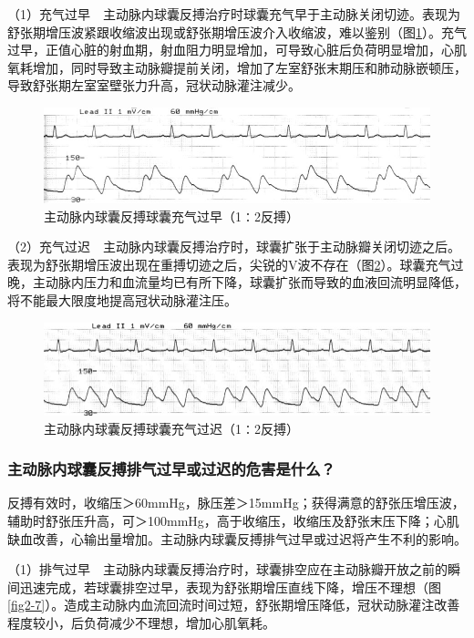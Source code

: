 （1）充气过早　主动脉内球囊反搏治疗时球囊充气早于主动脉关闭切迹。表现为舒张期增压波紧跟收缩波出现或舒张期增压波介入收缩波，难以鉴别（图\ref{fig2-5}）。充气过早，正值心脏的射血期，射血阻力明显增加，可导致心脏后负荷明显增加，心肌氧耗增加，同时导致主动脉瓣提前关闭，增加了左室舒张末期压和肺动脉嵌顿压，导致舒张期左室室壁张力升高，冠状动脉灌注减少。

\begin{figure}[!htbp]
 \centering
 \includegraphics{./images/Image00024.jpg}
 \captionsetup{justification=centering}
 \caption{主动脉内球囊反搏球囊充气过早（1∶2反搏）}
 \label{fig2-5}
  \end{figure} 

（2）充气过迟　主动脉内球囊反搏治疗时，球囊扩张于主动脉瓣关闭切迹之后。表现为舒张期增压波出现在重搏切迹之后，尖锐的V波不存在（图\ref{fig2-6}）。球囊充气过晚，主动脉内压力和血流量均已有所下降，球囊扩张而导致的血液回流明显降低，将不能最大限度地提高冠状动脉灌注压。

\begin{figure}[!htbp]
 \centering
 \includegraphics{./images/Image00025.jpg}
 \captionsetup{justification=centering}
 \caption{主动脉内球囊反搏球囊充气过迟（1∶2反搏）}
 \label{fig2-6}
  \end{figure} 

\subsubsection{主动脉内球囊反搏排气过早或过迟的危害是什么？}

反搏有效时，收缩压＞60mmHg，脉压差＞15mmHg；获得满意的舒张压增压波，辅助时舒张压升高，可＞100mmHg，高于收缩压，收缩压及舒张末压下降；心肌缺血改善，心输出量增加。主动脉内球囊反搏排气过早或过迟将产生不利的影响。

（1）排气过早　主动脉内球囊反搏治疗时，球囊排空应在主动脉瓣开放之前的瞬间迅速完成，若球囊排空过早，表现为舒张期增压直线下降，增压不理想（图\ref{fig2-7}）。造成主动脉内血流回流时间过短，舒张期增压降低，冠状动脉灌注改善程度较小，后负荷减少不理想，增加心肌氧耗。

